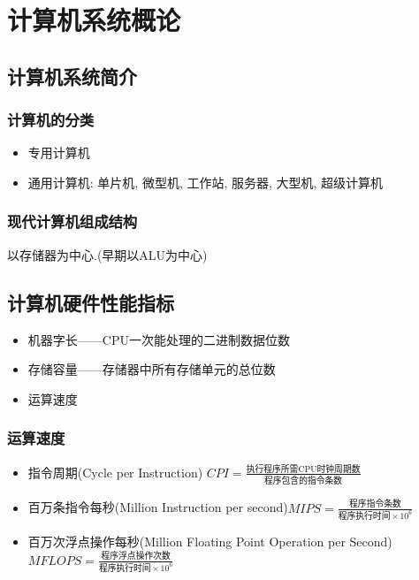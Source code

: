 \documentclass[UTF8]{article}
\newcommand{\itemblt}{\item[$\bullet$]}
\begin{document}
\section{计算机系统概论}

\subsection{计算机系统简介}

\subsubsection{计算机的分类}
\begin{itemize}
	\itemblt 专用计算机
	\itemblt 通用计算机: 单片机, 微型机, 工作站, 服务器, 大型机, 超级计算机
\end{itemize}

\subsubsection{现代计算机组成结构}
以存储器为中心.(早期以ALU为中心)

\subsection{计算机硬件性能指标}
\begin{itemize}
	\itemblt 机器字长——CPU一次能处理的二进制数据位数
	\itemblt 存储容量——存储器中所有存储单元的总位数
	\itemblt 运算速度
\end{itemize}

\subsubsection{运算速度}
\begin{itemize}
	\itemblt 指令周期(Cycle per Instruction) $CPI=\frac{\mbox{执行程序所需CPU时钟周期数}}{{\mbox{程序包含的指令条数}}}$
	\itemblt 百万条指令每秒(Million Instruction per second)$MIPS=\frac{\mbox{程序指令条数}}{{\mbox{程序执行时间}\times 10^6}}$
	\itemblt 百万次浮点操作每秒(Million Floating Point Operation per Second)$MFLOPS=\frac{\mbox{程序浮点操作次数}}{{\mbox{程序执行时间}\times 10^6}}$
\end{itemize}
\end{document}
